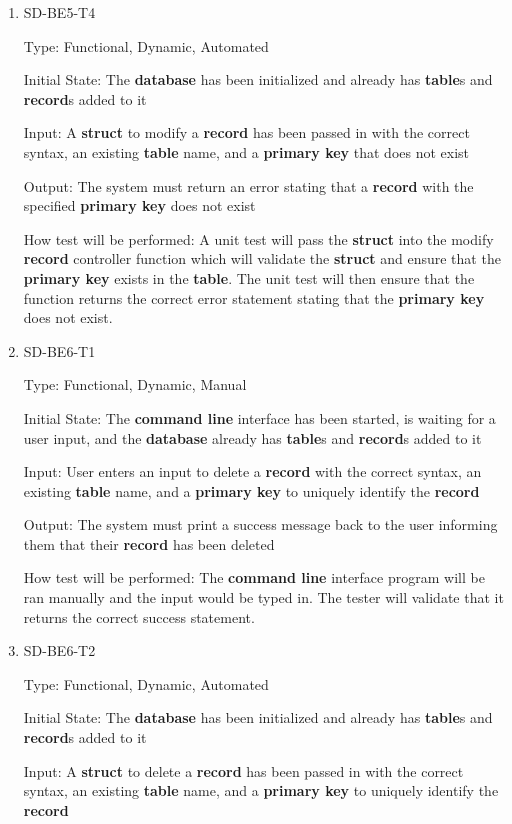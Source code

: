 \documentclass[12pt, titlepage]{article}
\begin{document}
\begin{enumerate}
\item{SD-BE5-T4}

Type: Functional, Dynamic, Automated
					
Initial State: The \textbf{database} has been initialized and already has \textbf{table}s and \textbf{record}s added to it
					
Input: A \textbf{struct} to modify a \textbf{record} has been passed in with the correct syntax, an existing \textbf{table} name, and a \textbf{primary key} that does not exist
					
Output: The system must return an error stating that a \textbf{record} with the specified \textbf{primary key} does not exist
					
How test will be performed: A unit test will pass the \textbf{struct} into the modify \textbf{record} controller function which will validate the \textbf{struct} and ensure that the \textbf{primary key} exists in the \textbf{table}. The unit test will then ensure that the function returns the correct error statement stating that the \textbf{primary key} does not exist.

\item{SD-BE6-T1}

Type: Functional, Dynamic, Manual
					
Initial State: The \textbf{command line} interface has been started, is waiting for a user input, and the \textbf{database} already has \textbf{table}s and \textbf{record}s added to it
					
Input: User enters an input to delete a \textbf{record} with the correct syntax, an existing \textbf{table} name, and a \textbf{primary key} to uniquely identify the \textbf{record}
					
Output: The system must print a success message back to the user informing them that their \textbf{record} has been deleted
					
How test will be performed: The \textbf{command line} interface program will be ran manually and the input would be typed in. The tester will validate that it returns the correct success statement.

\item{SD-BE6-T2}

Type: Functional, Dynamic, Automated
					
Initial State: The \textbf{database} has been initialized and already has \textbf{table}s and \textbf{record}s added to it
					
Input: A \textbf{struct} to delete a \textbf{record} has been passed in with the correct syntax, an existing \textbf{table} name, and a \textbf{primary key} to uniquely identify the \textbf{record}
					

\end{enumerate}
\end{document}
